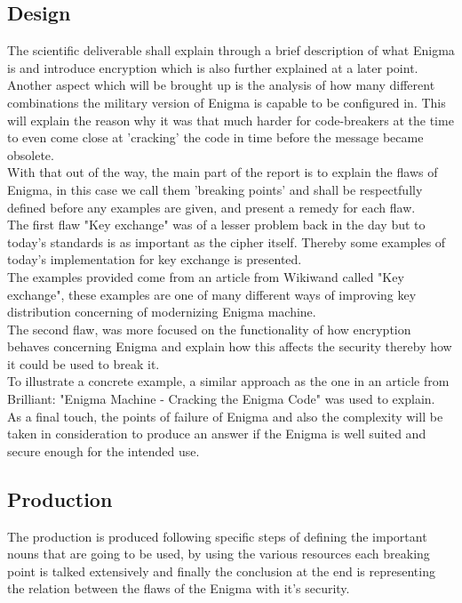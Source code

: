 \documentclass[conference,compsoc]{IEEEtran}
\begin{document}
\subsection{Design}
The scientific deliverable shall explain through a brief description of what Enigma is and introduce encryption which is also further explained at a later point. Another aspect which will be brought up is the analysis of how many different combinations the military version of Enigma is capable to be configured in. This will explain the reason why it was that much harder for code-breakers at the time to even come close at 'cracking' the code in time before the message became obsolete.\\
With that out of the way, the main part of the report is to explain the flaws of Enigma, in this case we call them 'breaking points' and shall be respectfully defined before any examples are given, and present a remedy for each flaw.\\

The first flaw "Key exchange" was of a lesser problem back in the day but to today's standards is as important as the cipher itself. Thereby some examples of today's implementation for key exchange is presented.\\
The examples provided come from an article from Wikiwand called "Key exchange", these examples are one of many different ways of improving key distribution concerning of modernizing Enigma machine.\\ 

The second flaw, was more focused on the functionality of how encryption behaves concerning Enigma and explain how this affects the security thereby how it could be used to break it.\\
To illustrate a concrete example, a similar approach as the one in an article from Brilliant: "Enigma Machine - Cracking the Enigma Code" was used to explain.\\

As a final touch, the points of failure of Enigma and also the complexity will be taken in consideration to produce an answer if the Enigma is well suited and secure enough for the intended use.\\

\subsection{Production}

The production is produced following specific steps of defining the important nouns that are going to be used, by using the various resources each breaking point is talked extensively and finally the conclusion at the end is representing the relation between the flaws of the Enigma with it's security.\\  
\end{document}
